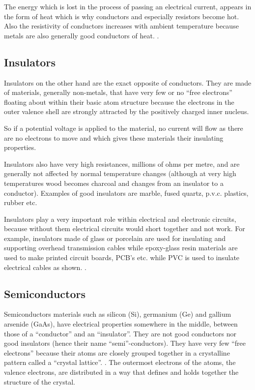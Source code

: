 \documentclass[main]{subfiles}
\begin{document}
The energy which is lost in the process of passing an electrical current, appears in the form of heat which is why conductors and especially resistors become hot. Also the resistivity of conductors increases with ambient temperature because metals are also generally good conductors of heat. \cite{diode-basics}.

\subsection{Insulators}
Insulators on the other hand are the exact opposite of conductors. They are made of materials, generally non-metals, that have very few or no “free electrons” floating about within their basic atom structure because the electrons in the outer valence shell are strongly attracted by the positively charged inner nucleus.

So if a potential voltage is applied to the material, no current will flow as there are no electrons to move and which gives these materials their insulating properties.

Insulators also have very high resistances, millions of ohms per metre, and are generally not affected by normal temperature changes (although at very high temperatures wood becomes charcoal and changes from an insulator to a conductor). Examples of good insulators are marble, fused quartz, p.v.c. plastics, rubber etc.

Insulators play a very important role within electrical and electronic circuits, because without them electrical circuits would short together and not work. For example, insulators made of glass or porcelain are used for insulating and supporting overhead transmission cables while epoxy-glass resin materials are used to make printed circuit boards, PCB’s etc. while PVC is used to insulate electrical cables as shown. \cite{diode-basics}.

\subsection{Semiconductors}

Semiconductors materials such as silicon (Si), germanium (Ge) and gallium arsenide (GaAs), have electrical properties somewhere in the middle, between those of a “conductor” and an “insulator”. They are not good conductors nor good insulators (hence their name “semi”-conductors). They have very few “free electrons” because their atoms are closely grouped together in a crystalline pattern called a “crystal lattice”. \cite{diode-basics}.  The outermost electrons of the atoms, the valence electrons, are distributed in a way that defines and holds together the structure of the crystal.
\end{document}
